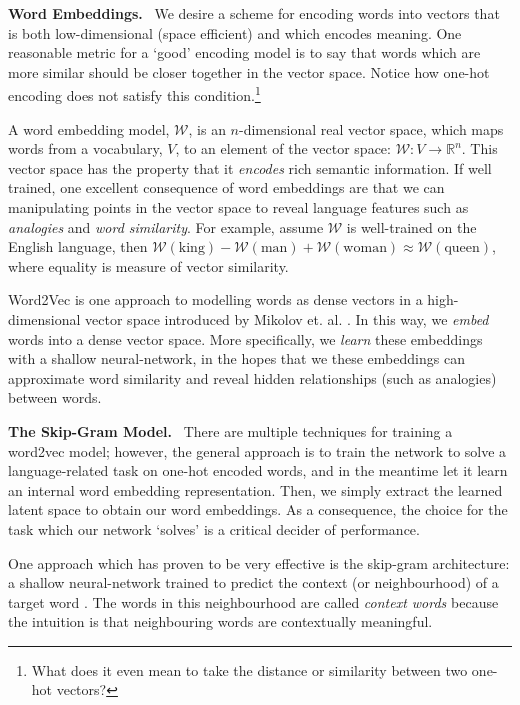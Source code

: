 \documentclass{paper}
\newcommand{\inlineSection}[1]{\vspace{0.5em}\noindent\textbf{#1.}~}
\begin{document}
\inlineSection{Word Embeddings} We desire a scheme for encoding words into vectors that is both low-dimensional (space efficient) and which encodes meaning. One reasonable metric for a `good' encoding model is to say that words which are more similar should be closer together in the vector space. Notice how one-hot encoding does not satisfy this condition.\footnote{What does it even mean to take the distance or similarity between two one-hot vectors?}

A word embedding model, $\mathcal{W}$, is an $n$-dimensional real vector space, which maps words from a vocabulary, $V$, to an element of the vector space: $\mathcal{W}: V \rightarrow \mathbb{R}^n$. This vector space has the property that it \textit{encodes} rich semantic information. If well trained, one excellent consequence of word embeddings are that we can manipulating points in the vector space to reveal language features such as \textit{analogies} and \textit{word similarity}. For example, assume $\mathcal{W}$ is well-trained on the English language, then $\mathcal{W}(\text{king}) - \mathcal{W}(\text{man}) + \mathcal{W}(\text{woman}) \approx \mathcal{W}(\text{queen})$, where equality is measure of vector similarity.

Word2Vec is one approach to modelling words as dense vectors in a high-dimensional vector space introduced by Mikolov et. al. \cite{mikolov2013efficient}. In this way, we \textit{embed} words into a dense vector space. More specifically, we \textit{learn} these embeddings with a shallow neural-network, in the hopes that we these embeddings can approximate word similarity and reveal hidden relationships (such as analogies) between words. 

\inlineSection{The Skip-Gram Model} There are multiple techniques for training a word2vec model; however, the general approach is to train the network to solve a language-related task on one-hot encoded words, and in the meantime let it learn an internal word embedding representation. Then, we simply extract the learned latent space to obtain our word embeddings. As a consequence, the choice for the task which our network `solves' is a critical decider of performance.

One approach which has proven to be very effective is the skip-gram architecture: a shallow neural-network trained to predict the context (or neighbourhood) of a target word \cite{goldberg2014word2vec, mikolov2013efficient}. The words in this neighbourhood are called \textit{context words} because the intuition is that neighbouring words are contextually meaningful.
\end{document}
